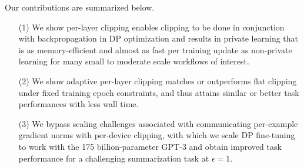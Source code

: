 Our contributions are summarized below. 
\begin{itemize}[leftmargin=6mm]
\item[(1)] We show per-layer clipping enables clipping to be done in conjunction with backpropagation in DP optimization and results in private learning that is as memory-efficient and almost as fast per training update as non-private learning for many small to moderate scale workflows of interest.
\item[(2)] We show adaptive per-layer clipping matches or outperforms flat clipping under fixed training epoch constraints, and thus attains similar or better task performances with less wall time.
\item[(3)] We bypass scaling challenges associated with communicating per-example gradient norms with per-device clipping, with which we scale DP fine-tuning to work with the 175 billion-parameter GPT-3 and obtain improved task performance for a challenging summarization task at $\epsilon=1$.
\end{itemize}






